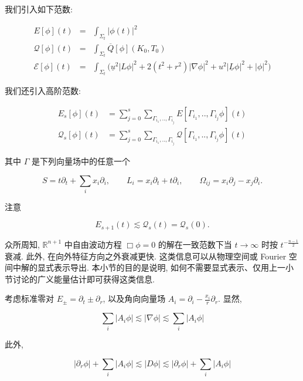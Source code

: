 \begin{definition}\label{def:cG-4.12}
我们引入如下范数:

\[
\begin{array}{rcl}
E[\phi](t) & = & \int_{\Sigma_{t}}|\phi(t)|^{2} \\
\mathcal{Q}[\phi](t) & = & \int_{\Sigma_{t}}\overline{Q}[\phi](K_{0},  T_{0}) \\
\mathcal{E}[\phi](t) & = & \int_{\Sigma_{t}}\bigg(\underline{u}^{2}|L\phi|^{2} + 2(t^{2} + r^{2})|\nabla\phi|^{2} + u^{2}|\underline{L}\phi|^{2} + |\phi|^{2}\bigg)
\end{array}
\]

我们还引入高阶范数:

\begin{align*}
E_{s}[\phi](t) &= \sum_{j = 0}^{s}\sum_{\Gamma_{i_{1}}, ..,  \Gamma_{i_{j}}} E[\Gamma_{i_{1}}, ..,  \Gamma_{i_{j}}\phi](t) \\
\mathcal{Q}_{s}[\phi](t) &= \sum_{j = 0}^{s}\sum_{\Gamma_{i_{1}}, ..,  \Gamma_{i_{j}}} \mathcal{Q}[\Gamma_{i_{1}}, ..,  \Gamma_{i_{j}}\phi](t)
\end{align*}

其中 $\Gamma$ 是下列向量场中的任意一个

\[
S = t\partial_{t} + \sum_{i}x_{i}\partial_{i},  \qquad L_{i} = x_{i}\partial_{t} + t\partial_{i},  \qquad \Omega_{ij} = x_{i}\partial_{j} - x_{j}\partial_{i}.
\]
\end{definition}

\begin{remark}\label{rem:cG-4.13}
注意

\[
E_{s + 1}(t) \lesssim \mathcal{Q}_{s}(t) = \mathcal{Q}_{s}(0).
\]
\end{remark}

众所周知, $\mathbb{R}^{n+1}$ 中自由波动方程 $\Box\phi = 0$ 的解在一致范数下当 $t \to \infty$ 时按 $t^{-\frac{n-1}{2}}$ 衰减. 此外, 在向外特征方向之外衰减更快. 这类信息可以从物理空间或 Fourier 空间中解的显式表示导出. 本小节的目的是说明, 如何不需要显式表示、仅用上一小节讨论的广义能量估计即可获得这类信息. 

考虑标准零对 $E_{\pm} = \partial_t \pm \partial_r$, 以及角向向量场 $A_i = \partial_i - \frac{x_i}{r}\partial_r$. 显然, 

\[
\sum_{i}|A_{i}\phi| \lesssim |\nabla\phi| \lesssim \sum_{i}|A_{i}\phi|
\]

此外, 

\[
|\partial_{r}\phi| + \sum_{i}|A_{i}\phi| \lesssim |D\phi| \lesssim |\partial_{r}\phi| + \sum_{i}|A_{i}\phi|
\]


